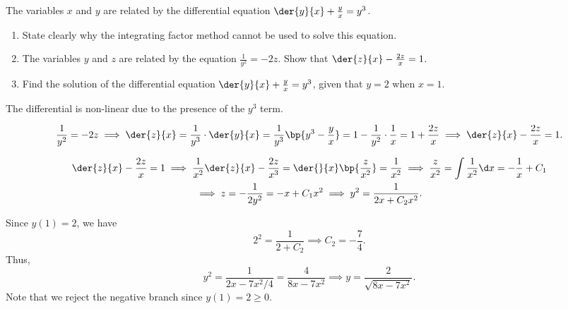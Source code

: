 \begin{problem}
    The variables $x$ and $y$ are related by the differential equation $\der{y}{x} + \frac{y}{x} = y^3$.
    \begin{enumerate}
        \item State clearly why the integrating factor method cannot be used to solve this equation.
        \item The variables $y$ and $z$ are related by the equation $\frac{1}{y^2} = -2z$. Show that $\der{z}{x} - \frac{2z}{x} = 1$.
        \item Find the solution of the differential equation $\der{y}{x} + \frac{y}{x} = y^3$, given that $y = 2$ when $x = 1$.
    \end{enumerate}
\end{problem}
\begin{solution}
    \begin{ppart}
        The differential is non-linear due to the presence of the $y^3$ term.
    \end{ppart}
    \begin{ppart}
        \[\frac{1}{y^2} = -2z \implies \der{z}{x} = \frac{1}{y^3} \cdot \der{y}{x} = \frac{1}{y^3} \bp{y^3 - \frac{y}{x}} = 1 - \frac{1}{y^2} \cdot \frac1x = 1 + \frac{2z}{x} \implies \der{z}{x} - \frac{2z}{x} = 1.\]
    \end{ppart}
    \begin{ppart}
        \begin{gather*}
            \der{z}{x} - \frac{2z}{x} = 1 \implies \frac1{x^2} \der{z}{x} - \frac{2z}{x^3} = \der{}{x} \bp{\frac{z}{x^2}} = \frac{1}{x^2}
            \implies \frac{z}{x^2} = \int \frac{1}{x^2} \d x = -\frac{1}{x} + C_1 \\
            \implies z = -\frac1{2y^2} = -x + C_1x^2 \implies y^2 = \frac1{2x + C_2 x^2}.
        \end{gather*}

        Since $y(1) = 2$, we have \[2^2 = \frac1{2 + C_2} \implies C_2 = -\frac74.\] Thus, \[y^2 = \frac1{2x - 7x^2/4} = \frac{4}{8x - 7x^2} \implies y = \frac2{\sqrt{8x-7x^2}}.\] Note that we reject the negative branch since $y(1) = 2 \geq 0$.
    \end{ppart}
\end{solution}

